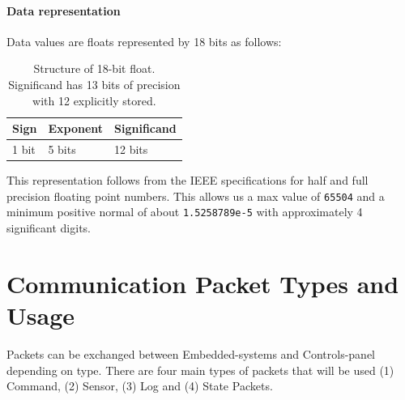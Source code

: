     \paragraph{Data representation}
    \label{par:data-repr}
    Data values are floats represented by 18 bits as follows:
    \begin{table}[H]
        \centering
        \begin{tabular}{@{}lll@{}} \toprule
            Sign & Exponent & Significand\\ \midrule
            1 bit & 5 bits & 12 bits\\ \bottomrule
        \end{tabular}
        \caption{Structure of 18-bit float. Significand has 13 bits of precision with 12 explicitly stored.}
    \end{table}
    This representation follows from the IEEE specifications for half and full precision floating point numbers. This allows us a max value of \texttt{65504} and a minimum positive normal of about \texttt{1.5258789e-5} with approximately 4 significant digits.
    \section{Communication Packet Types and Usage}
    Packets can be exchanged between Embedded-systems and Controls-panel depending on type. There are four main types of packets that will be used (1) Command, (2) Sensor, (3) Log and (4) State Packets.
